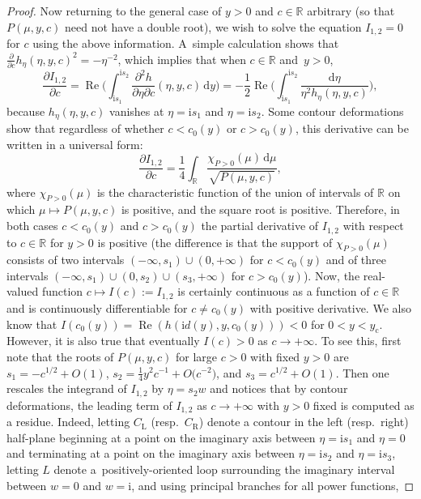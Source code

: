 \documentclass[11pt]{article}
\numberwithin{equation}{section}
\numberwithin{equation}{section}
\begin{document}
\begin{proof}
Now returning to the general case of $y>0$ and $c\in\mathbb{R}$ arbitrary (so that $P(\mu,y,c)$ need not have a double root), we wish to solve the equation $I_{1,2}=0$ for $c$ using the above information. A~simple calculation shows that $\frac{\partial}{\partial c}h_\eta(\eta,y,c)^2 = -\eta^{-2}$, which implies that when $c\in\mathbb{R}$ and~${y>0}$, 
\begin{equation*}
\frac{\partial I_{1,2}}{\partial c}=\operatorname{Re}\bigg(\int_{\mathrm{i} s_1}^{\mathrm{i} s_2}\frac{\partial^2 h}{\partial\eta\partial c}(\eta,y,c)\,\mathrm{d} y\bigg)=-\frac{1}{2}\operatorname{Re}\bigg(\int_{\mathrm{i} s_1}^{\mathrm{i} s_2}\frac{\mathrm{d}\eta}{\eta^2 h_\eta(\eta,y,c)}\bigg),
\end{equation*}
because $h_\eta(\eta,y,c)$ vanishes at $\eta=\mathrm{i} s_1$ and $\eta=\mathrm{i} s_2$. Some contour deformations show that regardless of whether $c<c_0(y)$ or $c>c_0(y)$, this derivative can be written in a universal form:
\begin{equation*}
\frac{\partial I_{1,2}}{\partial c}=\frac{1}{4}\int_\mathbb{R}\frac{\chi_{P>0}(\mu)\,\mathrm{d}\mu}{\sqrt{P(\mu,y,c)}},
\end{equation*}
where $\chi_{P>0}(\mu)$ is the characteristic function of the union of intervals of $\mathbb{R}$ on which $\mu\mapsto P(\mu,y,c)$ is positive, and the square root is positive. Therefore, in both cases $c<c_0(y)$ and $c>c_0(y)$ the partial derivative of $I_{1,2}$ with respect to $c\in\mathbb{R}$ for $y>0$ is positive (the difference is that the support of $\chi_{P>0}(\mu)$ consists of two intervals $(-\infty,s_1)\cup (0,+\infty)$ for $c<c_0(y)$ and of three intervals $(-\infty,s_1)\cup (0,s_2)\cup (s_3,+\infty)$ for $c>c_0(y)$). Now, the real-valued function $c\mapsto I(c):=I_{1,2}$ is certainly continuous as a function of $c\in\mathbb{R}$ and is continuously differentiable for $c\neq c_0(y)$ with positive derivative. We also know that $I(c_0(y))=\operatorname{Re}(h(\mathrm{i} d(y),y,c_0(y)))<0$ for $0<y<y_\mathrm{c}$. However, it is also true that eventually $I(c)>0$ as $c\to+\infty$. To see this, first note that the roots of $P(\mu,y,c)$ for large $c>0$ with fixed $y>0$ are $s_1=-c^{1/2}+O(1)$, $s_2=\frac{1}{4}y^2c^{-1}+O\bigl(c^{-2}\bigr)$, and $s_3=c^{1/2}+O(1)$. Then one rescales the integrand of $I_{1,2}$ by $\eta=s_2w$ and notices that by contour deformations, the leading term of $I_{1,2}$ as $c\to+\infty$ with $y>0$ fixed is computed as a residue. Indeed, letting $C_\mathrm{L}$ (resp.\ $C_\mathrm{R}$) denote a contour in the left (resp.\ right) half-plane beginning at a point on the imaginary axis between $\eta=\mathrm{i} s_1$ and $\eta=0$ and terminating at a point on the imaginary axis between $\eta=\mathrm{i} s_2$ and $\eta=\mathrm{i} s_3$, letting $L$ denote a~positively-oriented loop surrounding the imaginary interval between $w=0$ and $w=\mathrm{i}$, and using principal branches for all power functions,

\end{proof}
\end{document}

